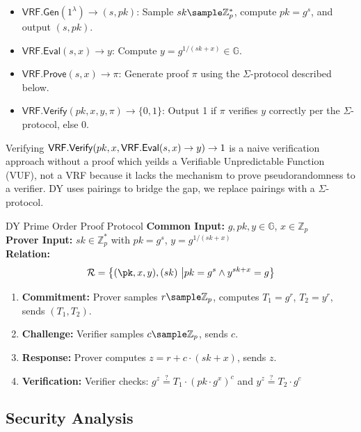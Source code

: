 \begin{itemize}
    \item $\mathsf{VRF.Gen}(1^\lambda) \to (s, pk)$: Sample $sk \sample \mathbb{Z}_p^*$, compute $pk = g^{s}$, and output $(s, pk)$.
    \item $\mathsf{VRF.Eval}(s, x) \to y$: Compute $y = g^{1/(sk + x)} \in \mathbb{G}$.
    \item $\mathsf{VRF.Prove}(s, x) \to \pi$: Generate proof $\pi$ using the $\Sigma$-protocol described below.
    \item $\mathsf{VRF.Verify}(pk, x, y, \pi) \to \{0, 1\}$: Output 1 if $\pi$ verifies $y$ correctly per the $\Sigma$-protocol, else 0.
\end{itemize}

\begin{remark}
    Verifying $\mathsf{VRF.Verify}(pk, x, \mathsf{VRF.Eval}(s, x) \to y) \to 1$ is a naive verification approach without a proof which yeilds a Verifiable Unpredictable Function (VUF), not a VRF because it lacks the mechanism to prove pseudorandomness to a verifier. DY uses pairings to bridge the gap, we replace pairings with a $\Sigma$-protocol. 
\end{remark}

\begin{protocol}{DY Prime Order Proof Protocol}{}\label{protocol-pdy-protocol1}
\textbf{Common Input:} $g, pk, y \in \mathbb{G}$, $x \in \mathbb{Z}_p$ \\
\textbf{Prover Input:} $sk \in \mathbb{Z}_p^*$ with $pk = g^{s}$, $y = g^{1/(sk + x)}$ \\
\textbf{Relation: }
\[
\mathcal{R} = \left\{ (\pk, x, y), (sk) \ \middle| pk = g^{s} \land y^{sk + x} = g \right\}
\]
\begin{enumerate}
    \item \textbf{Commitment:} Prover samples $r \sample  \mathbb{Z}_p$, computes $T_1 = g^r$, $T_2 = y^r$, sends $(T_1, T_2)$.
    \item \textbf{Challenge:} Verifier samples $c \sample  \mathbb{Z}_p$, sends $c$.
    \item \textbf{Response:} Prover computes $z = r + c \cdot (sk + x)$, sends $z$.
    \item \textbf{Verification:} Verifier checks: $g^z \stackrel{?}{=} T_1 \cdot (pk \cdot g^x)^c$ and $y^z \stackrel{?}{=} T_2 \cdot g^c$
\end{enumerate}
\end{protocol}

\subsection{Security Analysis}

